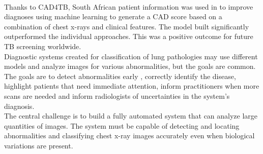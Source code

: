 \\
Thanks to CAD4TB, South African patient information was used in \cite{6} to improve diagnoses using machine learning to generate a CAD score based on a combination of chest x-rays and clinical features. The model built significantly outperformed the individual approaches. This was a positive outcome for future TB screening worldwide.\newline
\\
Diagnostic systems created for classification of lung pathologies may use different models and analyze images for various abnormalities, but the goals are common. The goals are to detect abnormalities early \cite{7}, correctly identify the disease, highlight patients that need immediate attention, inform practitioners when more scans are needed \cite{8} and inform radiologists of uncertainties in the system’s diagnosis\cite{2}.\newline
\\
The central challenge is to build a fully automated system that can analyze large quantities of images. The system must be capable of detecting and locating abnormalities and classifying chest x-ray images accurately even when biological variations are present.
